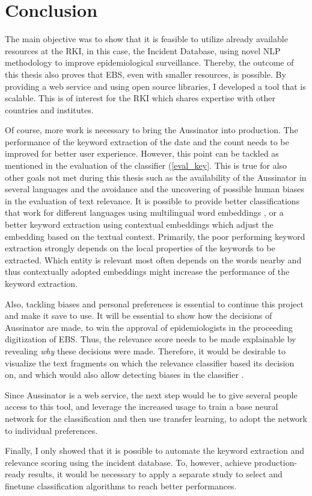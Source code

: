\chapter{Conclusion}
  The main objective was to show that it is feasible to utilize already available resources at the RKI, in this case, the Incident Database, using novel NLP methodology to improve epidemiological surveillance.
  Thereby, the outcome of this thesis also proves that EBS, even with smaller resources, is possible.
  By providing a web service and using open source libraries, I developed a tool that is scalable. This is of interest for the RKI which shares expertise with other countries and institutes.


  Of course, more work is necessary to bring the Aussinator into production.
  The performance of the keyword extraction of the date and the count needs to be improved for better user experience.
  However, this point can be tackled as mentioned in the evaluation of the classifier (\ref{eval_key}.
  This is true for also other goals not met during this thesis such as the availability of the Aussinator in several languages and the avoidance and the uncovering of possible human biases in the evaluation of text relevance.
  It is possible to provide better classifications that work for different languages using multilingual word embeddings \citep{Chen2018}, or a better keyword extraction using contextual embeddings \citep{Devlin2018, Peters2018} which adjust the embedding based on the textual context.
  Primarily, the poor performing keyword extraction strongly depends on the local properties of the keywords to be extracted. Which entity is relevant most often depends on the words nearby and thus contextually adopted embeddings might increase the performance of the keyword extraction.

  Also, tackling biases and personal preferences is essential to continue this project and make it save to use.
  It will be essential to show how the decisions of Aussinator are made, to win the approval of epidemiologists in the proceeding digitization of EBS.
  Thus, the relevance score needs to be made explainable by revealing \emph{why} these decisions were made.
  Therefore, it would be desirable to visualize the text fragments on which the relevance classifier based its decision on, and which would also allow detecting biases in the classifier \citep{Arras2017}.

  Since Aussinator is a web service, the next step would be to give several people access to this tool, and leverage the increased usage to train a base neural network for the classification and then use transfer learning, to adopt the network to individual preferences.

  Finally, I only showed that it is possible to automate the keyword extraction and relevance scoring using the incident database.
  To, however, achieve production-ready results, it would be necessary to apply a separate study to select and finetune classification algorithms to reach better performances.
